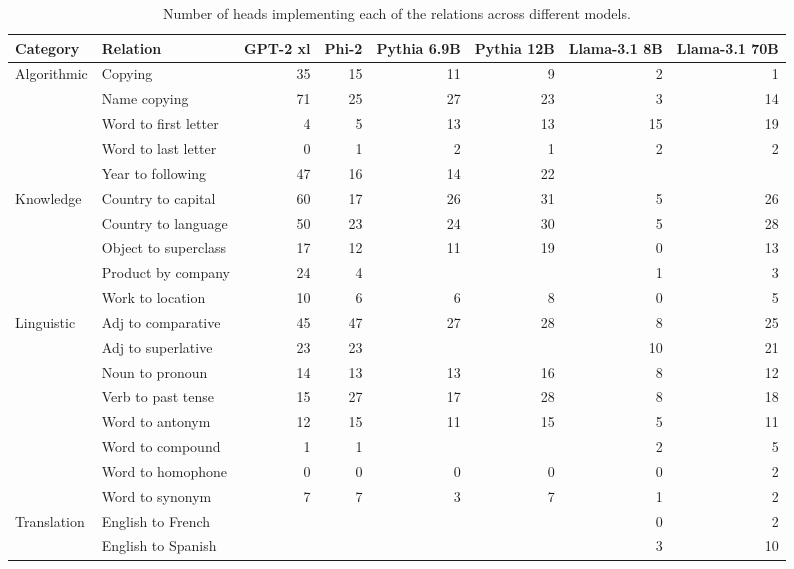 \documentclass[11pt]{article}
\begin{document}
\begin{table}[htbp]
\centering
\footnotesize
\begin{tabular}{llrrrrrr}
\toprule
Category & Relation & GPT-2 xl & Phi-2 & Pythia 6.9B & Pythia 12B & Llama-3.1 8B & Llama-3.1 70B \\
\midrule
\multirow{5}{*}{Algorithmic} & Copying & 35 & 15 & 11 & 9 & 2 & 1 \\
 & Name copying & 71 & 25 & 27 & 23 & 3 & 14 \\
 & Word to first letter & 4 & 5 & 13 & 13 & 15 & 19 \\
 & Word to last letter & 0 & 1 & 2 & 1 & 2 & 2 \\
 & Year to following & 47 & 16 & 14 & 22 &  &  \\
\midrule
\multirow{5}{*}{Knowledge} & Country to capital & 60 & 17 & 26 & 31 & 5 & 26 \\
 & Country to language & 50 & 23 & 24 & 30 & 5 & 28 \\
 & Object to superclass & 17 & 12 & 11 & 19 & 0 & 13 \\
 & Product by company & 24 & 4 &  &  & 1 & 3 \\
 & Work to location & 10 & 6 & 6 & 8 & 0 & 5 \\
 \midrule
\multirow{8}{*}{Linguistic} & Adj to comparative & 45 & 47 & 27 & 28 & 8 & 25 \\
 & Adj to superlative & 23 & 23 &  &  & 10 & 21 \\
 & Noun to pronoun & 14 & 13 & 13 & 16 & 8 & 12 \\
 & Verb to past tense & 15 & 27 & 17 & 28 & 8 & 18 \\
 & Word to antonym & 12 & 15 & 11 & 15 & 5 & 11 \\
 & Word to compound & 1 & 1 &  &  & 2 & 5 \\
 & Word to homophone & 0 & 0 & 0 & 0 & 0 & 2 \\
 & Word to synonym & 7 & 7 & 3 & 7 & 1 & 2 \\
 \midrule
\multirow{2}{*}{Translation}
 & English to French &  &  &  &  & 0 & 2 \\
 & English to Spanish &  &  &  &  & 3 & 10 \\
\bottomrule
\end{tabular}
\caption{Number of heads implementing each of the relations across different models. }
    \label{tab:counts_of_classified_heads}
\end{table}
\end{document}
